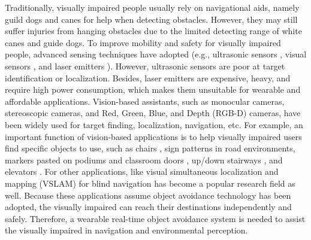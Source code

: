 \documentclass{ieeeaccess}
\begin{document}
Traditionally, visually impaired people usually rely on navigational aids, namely guild dogs \cite{BhatlawandeDesign} and canes \cite{7879309} for help when detecting obstacles. However, they may still suffer injuries from hanging obstacles due to the limited detecting range of white canes and guide dogs. To improve mobility and safety for visually impaired people, advanced sensing techniques have adopted (e.g., ultrasonic sensors \cite{shoval1998navbelt} \cite{shaikh2018wearable}, visual sensors \cite{brock2013supporting} \cite{huang2015indoor}, and laser emitters \cite{kulyukin2006robot}). However, ultrasonic sensors are poor at target identification or localization. Besides, laser emitters are expensive, heavy, and require high power consumption, which makes them unsuitable for wearable and affordable applications. Vision-based assistants, such as monocular cameras, stereoscopic cameras, and Red, Green, Blue, and Depth (RGB-D) cameras, have been widely used for target finding, localization, navigation, etc. For example, an important function of vision-based applications is to help visually impaired users find specific objects to use, such as chairs \cite{takizawa2019kinect}, sign patterns in road environments, markers pasted on podiums and classroom doors \cite{huang2019augmented}, up/down stairways \cite{westfechtel20163d} \cite{perez2014detection} \cite{westfechtel2018robust} \cite{souto2017stairs}, and elevators \cite{kuramochi2014recognition}. For other applications, like visual simultaneous localization and mapping (VSLAM) for blind navigation has become a popular research field \cite{murata2018smartphone} \cite{bai2018virtual} \cite{kacorri2018environmental} \cite{liu2018augmented} as well. Because these applications assume object avoidance technology has been adopted, the visually impaired can reach their destinations independently and safely. Therefore, a wearable real-time object avoidance system is needed to assist the visually impaired in navigation and environmental perception.
\end{document}
